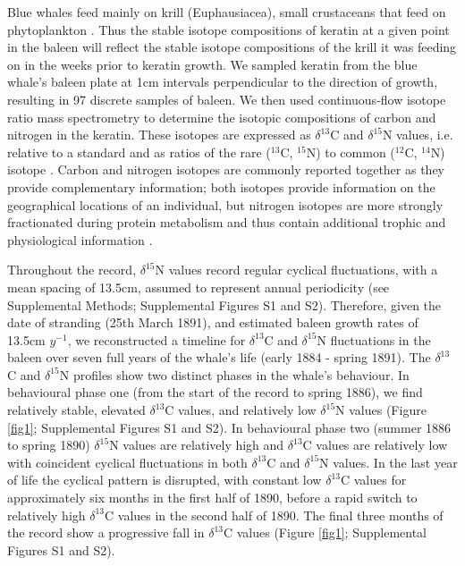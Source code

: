 \documentclass[a4paper,12pt]{article}
\begin{document}
Blue whales feed mainly on krill (Euphausiacea), small crustaceans that feed on phytoplankton \cite{handbook}.
Thus the stable isotope compositions of keratin at a given point in the baleen will reflect the stable isotope compositions of the krill it was feeding on in the weeks prior to keratin growth.
We sampled keratin from the blue whale's baleen plate at 1cm intervals perpendicular to the direction of growth, resulting in 97 discrete samples of baleen.
We then used continuous-flow isotope ratio mass spectrometry to determine the isotopic compositions of carbon and nitrogen in the keratin.
These isotopes are expressed as $\delta^{13}$C and $\delta^{15}$N values, i.e. relative to a standard and as ratios of the rare ($^{13}$C, $^{15}$N) to common ($^{12}$C, $^{14}$N) isotope \cite{west2006stable}.
Carbon and nitrogen isotopes are commonly reported together as they provide complementary information; both isotopes provide information on the geographical locations of an individual, but nitrogen isotopes are more strongly fractionated during protein metabolism and thus contain additional trophic and physiological information \cite{west2006stable}.

Throughout the record, $\delta^{15}$N values record regular cyclical fluctuations, with a mean spacing of 13.5cm, assumed to represent annual periodicity (see Supplemental Methods; Supplemental Figures S1 and S2). 
Therefore, given the date of stranding (25th March 1891), and estimated baleen growth rates of 13.5cm $y^{-1}$, we reconstructed a timeline for $\delta^{13}$C and $\delta^{15}$N fluctuations in the baleen over seven full years of the whale's life (early 1884 - spring 1891). 
The $\delta^{13}$C and $\delta^{15}$N profiles show two distinct phases in the whale's behaviour. 
In behavioural phase one (from the start of the record to spring 1886), we find relatively stable, elevated $\delta^{13}$C values, and relatively low $\delta^{15}$N values (Figure \ref{fig1}; Supplemental Figures S1 and S2). 
In behavioural phase two (summer 1886 to spring 1890) $\delta^{15}$N values are relatively high and $\delta^{13}$C values are relatively low with coincident cyclical fluctuations in both $\delta^{13}$C and $\delta^{15}$N values. 
In the last year of life the cyclical pattern is disrupted, with constant low $\delta^{13}$C values for approximately six months in the first half of 1890, before a rapid switch to relatively high $\delta^{13}$C values in the second half of 1890. 
The final three months of the record show a progressive fall in $\delta^{13}$C values (Figure \ref{fig1}; Supplemental Figures S1 and S2).
\end{document}
